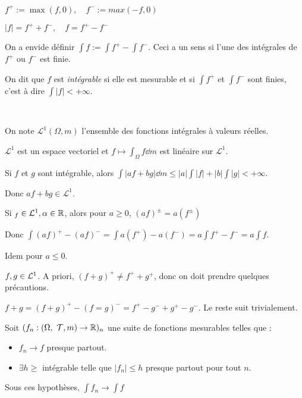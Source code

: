 \documentclass[10pt,a4paper,notitlepage ]{report}
\begin{document}
\begin{definition}
	
	$f^+ := \max(f,0), \quad f^- := max(-f, 0)$
	
	$|f| = f^+ + f^-, \quad f=f^+-f^-$
	
	On a envide définir $\int f := \int f^+ - \int f^-$. Ceci a un sens si l'une des intégrales de $f^+$ ou $f^-$ est finie.
	
	On dit que $f$ est \emph{intégrable} si elle est mesurable et si $\int f^+$ et $\int f^-$ sont finies, c'est à dire $\int|f| < +\infty$.
\end{definition}

\.\\

\begin{definition}
	On note $\mathcal L^1(\Omega,m)$ l'ensemble des fonctions intégrales à valeurs réelles.
\end{definition}

\begin{propriete}
	$\mathcal L^1$ est un espace vectoriel et $f\mapsto \int_\Omega f \dd m$ est linéaire sur $\mathcal L^1$.
\end{propriete}

\begin{demo}
	Si $f$ et $g$ sont intégrable, alors $\int|af+bg| \dd m \le |a|\int|f| + |b|\int|g| < + \infty$.

	Donc $af+bg \in \mathcal L^1$.

	Si $_f\in\mathcal L^1, \alpha\in \mathbb R$, alors pour $a\ge 0$, $(af)^\pm = a(f^\pm)$
	
	Donc $\int(af)^+ - (af)^- = \int a(f^+) - a(f^-) = a \int f^+-f^- = a\int f$.
	
	Idem pour $a\le 0$.
	
	$f,g\in \mathcal L^1$. A priori, $(f+g)^+ \neq f^+ + g^+$, donc on doit prendre quelques précautions.
	
	$f+g = (f+g)^+ - (f=g)^- = f^+ - g^- + g^+ - g^-$. Le reste suit trivialement.
	
\end{demo}

\begin{theorem}
	Soit $(f_n : (\Omega, \T, m) \rightarrow \R)_n$ une suite de fonctions mesurables telles que :
	\begin{itemize}
		\item $f_n \rightarrow f$ presque partout.
		\item $\exists h\ge$ intégrable telle que $|f_n| \le h$ presque partout pour tout $n$.
	\end{itemize}

	Sous ces hypothèses, $\int f_n \rightarrow \int f$
\end{theorem}
\end{document}

